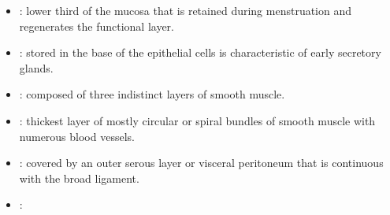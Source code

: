 \begin{multicols}{2}
\begin{itemize}
  \begin{center}
  \end{center}
  
  \item {}: lower third of the mucosa that is retained during menstruation and regenerates the functional layer.
  
  \begin{center}
  \end{center}
  
  \item {}: stored in the base of the epithelial cells is characteristic of early secretory glands. 
  
  \begin{center}
  \end{center}
  
  \item {}: composed of three indistinct layers of smooth muscle. 
  
  \begin{center}
  \end{center}
  
  \item {}: thickest layer of mostly circular or spiral bundles of smooth muscle with numerous blood vessels.
  
  \begin{center}
  \end{center}
  
  \item {}: covered by an outer serous layer or visceral peritoneum that is continuous with the broad ligament.
  
  \begin{center}
  \end{center}

  \item {}:
  
  \begin{center}
  \end{center}
  

\end{itemize}
\end{multicols}
